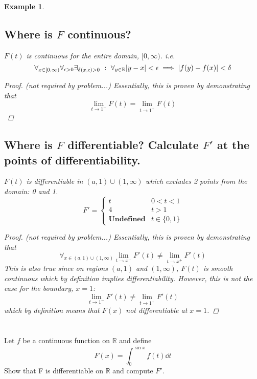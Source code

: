 \documentclass[]{article}
\newcommand{\R}{\mathbb{R}}
\newcommand{\st}{\ : \ }
\newtheorem{example}{Example}
\begin{document}
\begin{example}
    \subsection{Where is $F$ continuous?}
    $F(t)$ is continuous for the entire domain, $[0,\infty)$. i.e. \[
        \forall_{x \in [0,\infty)} \forall_{\epsilon>0} \exists_{\delta(x,\epsilon) > 0} \st \forall_{y \in \R} \abs{y-x} < \epsilon \implies \abs{f(y) - f(x)} < \delta
    \]
    \begin{proof}
        (not required by problem...)
        Essentially, this is proven by demonstrating that \[
            \lim_{t \to 1^{-}} F(t) = \lim_{t \to 1^{+}} F(t)
        \]
    \end{proof}

    \subsection{Where is $F$ differentiable? Calculate $F'$ at the points of differentiability.}
    $F(t)$ is differentiable in $(a,1) \cup (1,\infty)$ which excludes 2 points from the domain: 0 and 1.\[
        F' = \begin{cases}
            t & 0 < t < 1\\
            4 & t > 1\\
            \textbf{Undefined} & t \in \{0, 1\}
        \end{cases}
    \]
    \begin{proof}
        (not required by problem...)
        Essentially, this is proven by demonstrating that \[
            \forall_{x \in (a,1) \cup (1,\infty)} \lim_{t \to x^{-}} F'(t) \neq \lim_{t \to x^{+}} F'(t)
        \] This is also true since on regions $(a,1)$ and $(1,\infty)$, $F(t)$ is smooth continuous which by definition implies differentiability.
        However, this is not the case for the boundary, $x=1$:\[
            \lim_{t \to 1^{-}} F'(t) \neq \lim_{t \to 1^{+}} F'(t)
        \] which by definition means that $F(x)$ not differentiable at $x = 1$.
    \end{proof}

\end{example}

\newpage
\section{}
Let $f$ be a continuous function on $\R$ and define\[
    F(x) = \int_{0}^{\sin{x}} f(t) \dd{t}
\] Show that F is differentiable on $\R$ and compute $F'$.
\end{document}
